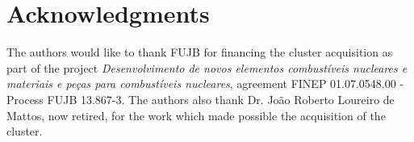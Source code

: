 \documentclass[twoside,a4paper,12pt,english]{inac19}
\begin{document}





\section*{Acknowledgments}
The authors would like to thank FUJB for financing the cluster acquisition
as part of the project \textit{Desenvolvimento de novos elementos combust\'{i}veis nucleares
  e materiais e pe\c{c}as para combust\'{i}veis nucleares}, agreement FINEP 01.07.0548.00 - Process FUJB 13.867-3.
The authors also thank Dr. Jo\~{a}o Roberto Loureiro de Mattos, now retired, for the work which made possible the acquisition of the cluster.

\end{document}
